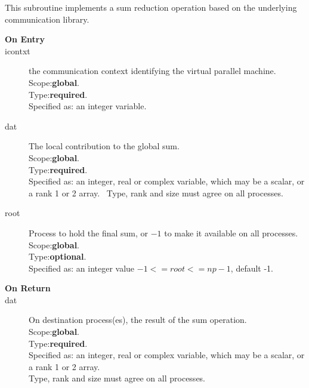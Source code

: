 This subroutine implements a sum reduction  operation based on the
underlying communication library. 
\begin{description}
\item[\bf  On Entry ]
\item[icontxt] the communication context identifying the virtual
  parallel machine.\\
Scope:{\bf global}.\\
Type:{\bf required}.\\
Specified as: an integer variable.
\item[dat] The local contribution to the global sum.\\
Scope:{\bf global}.\\
Type:{\bf required}.\\
Specified as: an integer, real or complex variable, which may be a
scalar, or a rank 1 or 2 array. \
Type, rank and size must agree on all processes.
\item[root] Process to hold the final sum, or $-1$ to make it available
  on all processes.\\
Scope:{\bf global}.\\
Type:{\bf optional}.\\
Specified as: an integer value $-1<= root <= np-1$, default -1. \
\end{description}


\begin{description}
\item[\bf On Return]
\item[dat] On destination process(es), the result of the sum operation.\\
Scope:{\bf global}.\\
Type:{\bf required}.\\
Specified as: an integer, real or complex variable, which may be a
scalar, or a rank 1 or 2 array. \\
Type, rank and size must agree on all processes.
\end{description}



